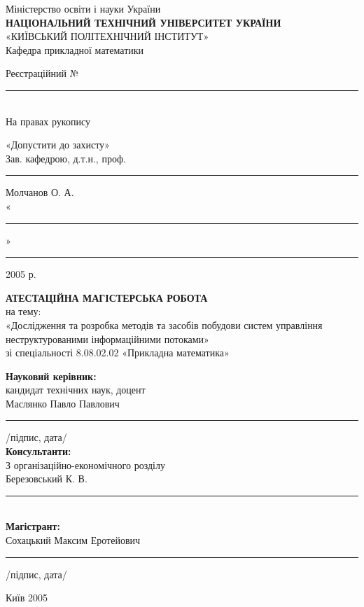 \documentclass{memoir}
\begin{document}
\begin{center}
    \vspace*{1cm}
    {\small Міністерство освіти і науки України}\\[0.3cm]
    {\large \textbf{НАЦІОНАЛЬНИЙ ТЕХНІЧНИЙ УНІВЕРСИТЕТ УКРАЇНИ}}\\[0.3cm]
    {\large «КИЇВСЬКИЙ ПОЛІТЕХНІЧНИЙ ІНСТИТУТ»}\\[0.5cm]
    {\normalsize Кафедра прикладної математики}\\[0.5cm]
    
    {\small Реєстраційний № \rule{3cm}{0.4pt}}\\[1cm]
    
    {\small На правах рукопису}\\[1cm]
    
    \begin{flushright}
        \parbox{0.45\textwidth}{
            \raggedright
            «Допустити до захисту»\\
            Зав. кафедрою, д.т.н., проф.\\
            \rule{2cm}{0.4pt} Молчанов О. А.\\
            «\rule{1cm}{0.4pt}» \rule{2cm}{0.4pt} 2005 р.
        }
    \end{flushright}
    
    \vspace{1cm}
    {\Large \textbf{АТЕСТАЦІЙНА МАГІСТЕРСЬКА РОБОТА}}\\[0.5cm]
    {\normalsize на тему:}\\[0.3cm]
    {\large «Дослідження та розробка методів та засобів побудови систем управління неструктурованими інформаційними потоками»}\\[0.5cm]
    
    {\normalsize зі спеціальності 8.08.02.02 «Прикладна математика»}\\[0.5cm]
    
    \begin{flushleft}
        \parbox{\textwidth}{
            \raggedright
            \textbf{Науковий керівник:}\\
            кандидат технічних наук, доцент\\
            Маслянко Павло Павлович\\
            \rule{3cm}{0.4pt} \hfill /підпис, дата/\\[0.5cm]
            
            \textbf{Консультанти:}\\
            З організаційно-економічного розділу\\
            Березовський К. В.\\
            \rule{3cm}{0.4pt}\\[0.5cm]
            
            \textbf{Магістрант:}\\
            Сохацький Максим Еротейович\\
            \rule{3cm}{0.4pt} \hfill /підпис, дата/
        }
    \end{flushleft}
    
    \vfill
    {\normalsize Київ 2005}
\end{center}
\end{document}
